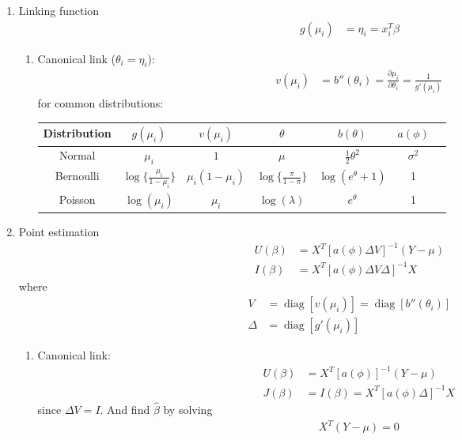 \message{ !name(biostat651_summary.tex)}\documentclass{amsart}
\begin{document}
\begin{enumerate}
\begin{enumerate}
  \end{enumerate}
\item Linking function
  \begin{align*}
    g(\mu_i) & = \eta_i = x_i^T \beta 
  \end{align*}
  \begin{enumerate}
  \item Canonical link ($\theta_i = \eta_i$):
    \begin{align*}
      v(\mu_i) & = b''(\theta_i) = \frac{\partial\mu_i}{\partial\theta_i} = \frac{1}{g'(\mu_i)}
    \end{align*}
    for common distributions: \bigskip
    \begin{center}
      \begin{tabular}{|c|c|c|c|c|c|c|}
        \hline
        Distribution & $g(\mu_i)$ & $v(\mu_i)$ & $\theta$ & $b(\theta)$ & $a(\phi)$ \\
        \hline
        Normal & $\mu_i$ & $1$ & $\mu$ & $ \frac{1}{2} \theta^2 $ & $\sigma^2$ \\
        \hline
        Bernoulli & $\log\{\frac{\mu_i}{1-\mu_i}\}$ & $\mu_i(1-\mu_i)$ & $\log\{\frac{\pi}{1-\pi}\}$ & $\log(e^\theta+1)$ & 1 \\
        \hline
        Poisson & $\log(\mu_i)$ & $\mu_i$ & $\log(\lambda)$ & $e^\theta$ & 1 \\
        \hline
      \end{tabular}
    \end{center}
  \end{enumerate}

\item Point estimation
  \begin{align*}
    U(\beta) & = X^T [a(\phi) \Delta V]^{-1} (Y - \mu) \\
    I(\beta) & = X^T [a(\phi) \Delta V \Delta]^{-1} X 
  \end{align*}
  where
  \begin{align*}
    V & = \operatorname{diag}[v(\mu_i)] = \operatorname{diag}[b''(\theta_i)] \\
    \Delta & = \operatorname{diag} [g'(\mu_i)]
  \end{align*}
  \begin{enumerate}
  \item Canonical link:
    \begin{align*}
      U(\beta) & = X^T [a(\phi)]^{-1} (Y - \mu) \\
      J(\beta) & = I(\beta) = X^T [a(\phi) \Delta]^{-1} X 
    \end{align*}
    since $\Delta V = I$. And find $\hat{\beta}$ by solving
    \begin{align*}
      X^T(Y - \mu) = 0
    \end{align*}
  \end{enumerate}
  

\end{enumerate}
\end{document}

